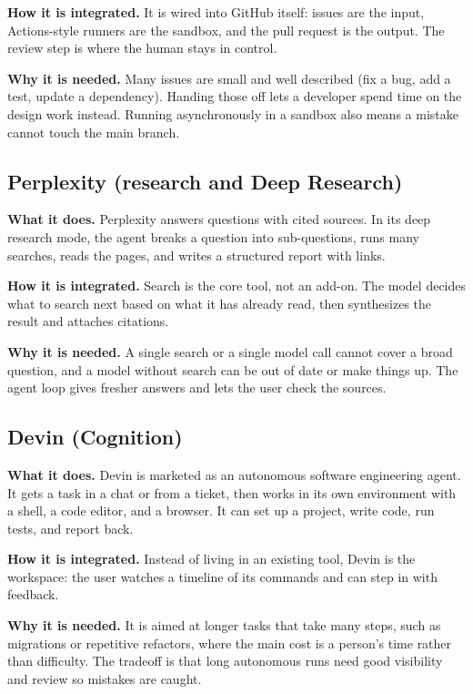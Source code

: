\documentclass[11pt]{article}
\begin{document}
\textbf{How it is integrated.} It is wired into GitHub itself: issues are the input,
Actions-style runners are the sandbox, and the pull request is the output. The
review step is where the human stays in control.

\textbf{Why it is needed.} Many issues are small and well described (fix a bug, add
a test, update a dependency). Handing those off lets a developer spend time on the
design work instead. Running asynchronously in a sandbox also means a mistake cannot
touch the main branch.

\subsection{Perplexity (research and Deep Research)}
\textbf{What it does.} Perplexity answers questions with cited sources. In its deep
research mode, the agent breaks a question into sub-questions, runs many searches,
reads the pages, and writes a structured report with links.

\textbf{How it is integrated.} Search is the core tool, not an add-on. The model
decides what to search next based on what it has already read, then synthesizes the
result and attaches citations.

\textbf{Why it is needed.} A single search or a single model call cannot cover a
broad question, and a model without search can be out of date or make things up.
The agent loop gives fresher answers and lets the user check the sources.

\subsection{Devin (Cognition)}
\textbf{What it does.} Devin is marketed as an autonomous software engineering
agent. It gets a task in a chat or from a ticket, then works in its own environment
with a shell, a code editor, and a browser. It can set up a project, write code, run
tests, and report back.

\textbf{How it is integrated.} Instead of living in an existing tool, Devin is the
workspace: the user watches a timeline of its commands and can step in with
feedback.

\textbf{Why it is needed.} It is aimed at longer tasks that take many steps, such
as migrations or repetitive refactors, where the main cost is a person's time rather
than difficulty. The tradeoff is that long autonomous runs need good visibility and
review so mistakes are caught.
\end{document}
